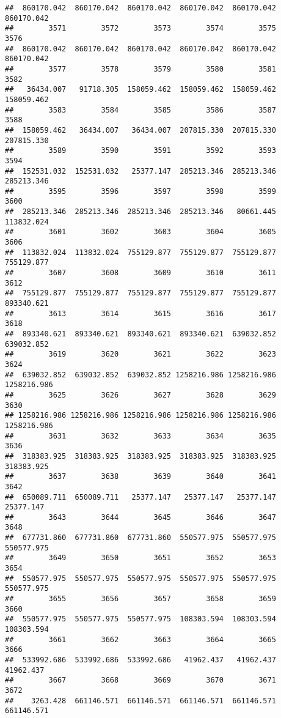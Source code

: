 \documentclass[
]{book}
\begin{document}
\begin{verbatim}
##  860170.042  860170.042  860170.042  860170.042  860170.042  860170.042 
##        3571        3572        3573        3574        3575        3576 
##  860170.042  860170.042  860170.042  860170.042  860170.042  860170.042 
##        3577        3578        3579        3580        3581        3582 
##   36434.007   91718.305  158059.462  158059.462  158059.462  158059.462 
##        3583        3584        3585        3586        3587        3588 
##  158059.462   36434.007   36434.007  207815.330  207815.330  207815.330 
##        3589        3590        3591        3592        3593        3594 
##  152531.032  152531.032   25377.147  285213.346  285213.346  285213.346 
##        3595        3596        3597        3598        3599        3600 
##  285213.346  285213.346  285213.346  285213.346   80661.445  113832.024 
##        3601        3602        3603        3604        3605        3606 
##  113832.024  113832.024  755129.877  755129.877  755129.877  755129.877 
##        3607        3608        3609        3610        3611        3612 
##  755129.877  755129.877  755129.877  755129.877  755129.877  893340.621 
##        3613        3614        3615        3616        3617        3618 
##  893340.621  893340.621  893340.621  893340.621  639032.852  639032.852 
##        3619        3620        3621        3622        3623        3624 
##  639032.852  639032.852  639032.852 1258216.986 1258216.986 1258216.986 
##        3625        3626        3627        3628        3629        3630 
## 1258216.986 1258216.986 1258216.986 1258216.986 1258216.986 1258216.986 
##        3631        3632        3633        3634        3635        3636 
##  318383.925  318383.925  318383.925  318383.925  318383.925  318383.925 
##        3637        3638        3639        3640        3641        3642 
##  650089.711  650089.711   25377.147   25377.147   25377.147   25377.147 
##        3643        3644        3645        3646        3647        3648 
##  677731.860  677731.860  677731.860  550577.975  550577.975  550577.975 
##        3649        3650        3651        3652        3653        3654 
##  550577.975  550577.975  550577.975  550577.975  550577.975  550577.975 
##        3655        3656        3657        3658        3659        3660 
##  550577.975  550577.975  550577.975  108303.594  108303.594  108303.594 
##        3661        3662        3663        3664        3665        3666 
##  533992.686  533992.686  533992.686   41962.437   41962.437   41962.437 
##        3667        3668        3669        3670        3671        3672 
##    3263.428  661146.571  661146.571  661146.571  661146.571  661146.571 

\end{verbatim}
\end{document}
